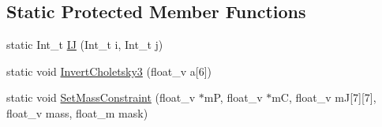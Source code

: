 \subsection*{Static Protected Member Functions}
\begin{DoxyCompactItemize}
\item 
static Int\+\_\+t \hyperlink{classKFParticleBaseSIMD_a23c8f9fa65a42b162990806191f91148}{IJ} (Int\+\_\+t i, Int\+\_\+t j)
\item 
static void \hyperlink{classKFParticleBaseSIMD_a4050fd23fd4493d83633bb00a312522b}{Invert\+Choletsky3} (float\+\_\+v a\mbox{[}6\mbox{]})
\item 
static void \hyperlink{classKFParticleBaseSIMD_a64947e4a11a881b3a36da3e5d529d99f}{Set\+Mass\+Constraint} (float\+\_\+v $\ast$mP, float\+\_\+v $\ast$mC, float\+\_\+v mJ\mbox{[}7\mbox{]}\mbox{[}7\mbox{]}, float\+\_\+v mass, float\+\_\+m mask)
\end{DoxyCompactItemize}
